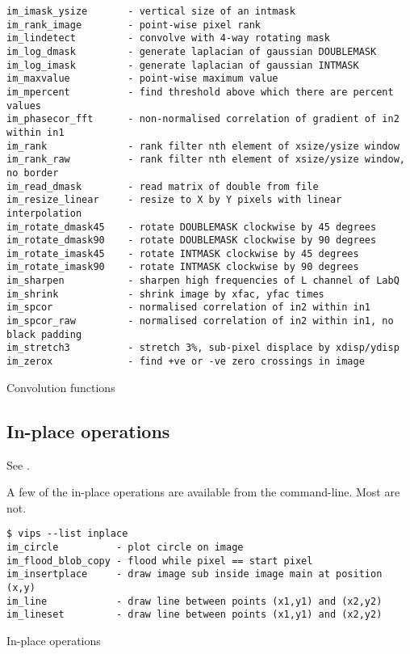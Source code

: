 \begin{fig2}
\begin{verbatim}
im_imask_ysize       - vertical size of an intmask
im_rank_image        - point-wise pixel rank
im_lindetect         - convolve with 4-way rotating mask
im_log_dmask         - generate laplacian of gaussian DOUBLEMASK
im_log_imask         - generate laplacian of gaussian INTMASK
im_maxvalue          - point-wise maximum value
im_mpercent          - find threshold above which there are percent values
im_phasecor_fft      - non-normalised correlation of gradient of in2 within in1
im_rank              - rank filter nth element of xsize/ysize window
im_rank_raw          - rank filter nth element of xsize/ysize window, no border
im_read_dmask        - read matrix of double from file
im_resize_linear     - resize to X by Y pixels with linear interpolation
im_rotate_dmask45    - rotate DOUBLEMASK clockwise by 45 degrees
im_rotate_dmask90    - rotate DOUBLEMASK clockwise by 90 degrees
im_rotate_imask45    - rotate INTMASK clockwise by 45 degrees
im_rotate_imask90    - rotate INTMASK clockwise by 90 degrees
im_sharpen           - sharpen high frequencies of L channel of LabQ
im_shrink            - shrink image by xfac, yfac times
im_spcor             - normalised correlation of in2 within in1
im_spcor_raw         - normalised correlation of in2 within in1, no black padding
im_stretch3          - stretch 3%, sub-pixel displace by xdisp/ydisp
im_zerox             - find +ve or -ve zero crossings in image
\end{verbatim}
\caption{Convolution functions}
\label{fg:convolution}
\end{fig2}

\subsection{In-place operations}
\label{sec:inplace}

See .

A few of the in-place operations are available from the command-line. Most are
not. 

\begin{fig2}
\begin{verbatim}
$ vips --list inplace
im_circle          - plot circle on image
im_flood_blob_copy - flood while pixel == start pixel
im_insertplace     - draw image sub inside image main at position (x,y)
im_line            - draw line between points (x1,y1) and (x2,y2)
im_lineset         - draw line between points (x1,y1) and (x2,y2)
\end{verbatim}
\caption{In-place operations}
\label{fg:inplace}
\end{fig2}

